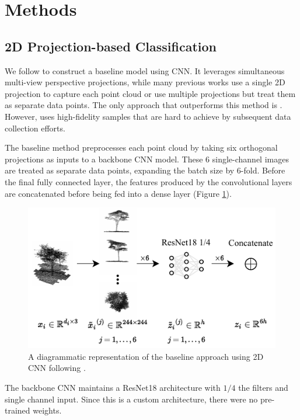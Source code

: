 \documentclass[letterpaper]{article} %
\begin{document}
\section{Methods}

\subsection{2D Projection-based Classification}

We follow \citealt{allen} to construct a baseline model using CNN. It leverages simultaneous multi-view perspective projections, while many previous works use a single 2D projection to capture each point cloud or use multiple projections but treat them as separate data points. The only approach that outperforms this method is \citealt{zou2017tree}. However, \citealt{zou2017tree} uses high-fidelity samples that are hard to achieve by subsequent data collection efforts.

The baseline method preprocesses each point cloud by taking six orthogonal projections as inputs to a backbone CNN model. These 6 single-channel images are treated as separate data points, expanding the batch size by 6-fold. Before the final fully connected layer, the features produced by the convolutional layers are concatenated before being fed into a dense layer (Figure \ref{fig:baseline}).

\begin{figure}
    \includegraphics[width=\columnwidth]{baseline.pdf}
    \caption{A diagrammatic representation of the baseline approach using 2D CNN following \citealt{allen}.}
    \label{fig:baseline}
\end{figure}

The backbone CNN maintains a ResNet18 architecture with $1/4$ the filters and single channel input. Since this is a custom architecture, there were no pre-trained weights.
\end{document}
